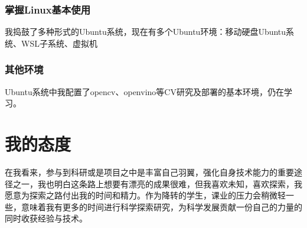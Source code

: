 \documentclass[UTF8]{ctexart}
\begin{document}
	\subsubsection{掌握Linux基本使用}
	我捣鼓了多种形式的Ubuntu系统，现在有多个Ubuntu环境：移动硬盘Ubuntu系统、WSL子系统、虚拟机
	\subsubsection{其他环境}
	Ubuntu系统中我配置了opencv、openvino等CV研究及部署的基本环境，仍在学习。

	\section{我的态度}
	在我看来，参与到科研或是项目之中是丰富自己羽翼，强化自身技术能力的重要途径之一，我也明白这条路上想要有漂亮的成果很难，但我喜欢未知，喜欢探索，我愿意为探索之路付出我的时间和精力。作为降转的学生，课业的压力会稍微轻一些，意味着我有更多的时间进行科学探索研究，为科学发展贡献一份自己的力量的同时收获经验与技术。
	
\end{document}
